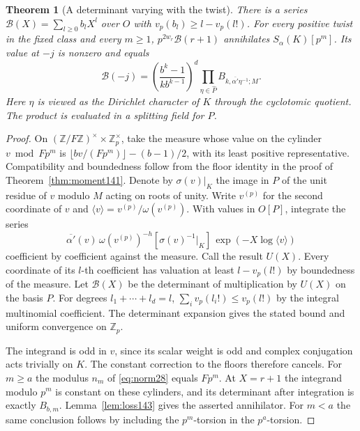 \documentclass[a4paper,11pt]{article}
\newtheorem{theorem}[proposition]{Theorem}
\theoremstyle{definition}
\theoremstyle{remark}
\newcommand{\ZZ}{\mathbb Z}\newcommand{\ord}{\operatorname{ord}}
\numberwithin{equation}{section}
\begin{document}
\begin{theorem}[A determinant varying with the twist]\leavevmode\label{thm:family143}
There is a series \(\mathcal B(X)=\sum_{l\ge0}b_l X^l\)
over \(O\) with \(v_p(b_l)\ge l-v_p(l!)\).
For every positive twist in the fixed class and every \(m\ge1\),
\(p^{2w_r}\mathcal B(r+1)\) annihilates \(S_\alpha(K)[p^m]\).
Its value at \(-j\) is nonzero and equals
\begin{equation}
 \mathcal B(-j)=
 \left(\frac{b^k-1}{k b^{k-1}}\right)^d
 \prod_{\eta\in\widehat P} B_{k,\overline{\alpha'}\eta^{-1};M}.
 \label{eq:family143}
\end{equation}
Here \(\eta\) is viewed as the Dirichlet character of \(K\)
through the cyclotomic quotient. The product is evaluated in
a splitting field for \(P\).
\end{theorem}
\begin{proof}
On \((\ZZ/F\ZZ)^\times\times\ZZ_p^\times\), take the measure
whose value on the cylinder \(v\bmod Fp^m\) is
\(\lfloor bv/(Fp^m)\rfloor-(b-1)/2\), with its least positive
representative. Compatibility and boundedness follow from the
floor identity in the proof of Theorem~\ref{thm:moment141}.
Denote by \(\sigma(v)|_K\) the image in \(P\) of the unit
residue of \(v\) modulo \(M\) acting on roots of unity. Write
\(v^{(p)}\) for the second coordinate of \(v\) and
\(\langle v\rangle=v^{(p)}/\omega(v^{(p)})\).
With values in \(O[P]\), integrate the series
\[
 \overline{\alpha'}(v)\,\omega(v^{(p)})^{-h}
      [\sigma(v)^{-1}|_K]\,
              \exp(-X\log\langle v\rangle)
\]
coefficient by coefficient against the measure. Call the result
\(U(X)\). Every coordinate of its \(l\)-th coefficient has
valuation at least \(l-v_p(l!)\) by boundedness of the measure.
Let \(\mathcal B(X)\) be the determinant of multiplication by
\(U(X)\) on the basis \(P\). For degrees \(l_1+\cdots+l_d=l\),
\(\sum_i v_p(l_i!)\le v_p(l!)\) by the integral multinomial
coefficient. The determinant expansion gives the stated bound
and uniform convergence on \(\ZZ_p\).

The integrand is odd in \(v\), since its scalar weight is odd
and complex conjugation acts trivially on \(K\). The constant
correction to the floors therefore cancels. For \(m\ge a\)
the modulus \(n_m\) of \eqref{eq:norm28} equals \(Fp^m\).
At \(X=r+1\) the integrand modulo \(p^m\) is constant on these
cylinders, and its determinant after integration is exactly
\(B_{b,m}\). Lemma~\ref{lem:loss143} gives the asserted
annihilator. For \(m<a\) the same conclusion follows by
including the \(p^m\)-torsion in the \(p^a\)-torsion.


\end{proof}
\end{document}
